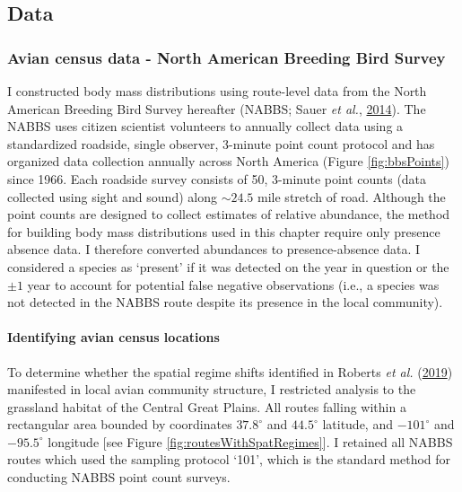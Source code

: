 \documentclass[12pt,twoside,openany]{reedthesis}
\begin{document}
\hypertarget{data}{%
\subsection{Data}\label{data}}

\hypertarget{avian-census-data---north-american-breeding-bird-survey}{%
\subsubsection{Avian census data - North American Breeding Bird Survey}\label{avian-census-data---north-american-breeding-bird-survey}}

I constructed body mass distributions using route-level data from the North American Breeding Bird Survey hereafter (NABBS; Sauer \emph{et al.}, \protect\hyperlink{ref-sauer2017results}{2014}). The NABBS uses citizen scientist volunteers to annually collect data using a standardized roadside, single observer, 3-minute point count protocol and has organized data collection annually across North America (Figure \ref{fig:bbsPoints}) since 1966. Each roadside survey consists of 50, 3-minute point counts (data collected using sight and sound) along \(\sim24.5\) mile stretch of road. Although the point counts are designed to collect estimates of relative abundance, the method for building body mass distributions used in this chapter require only presence absence data. I therefore converted abundances to presence-absence data. I considered a species as `present' if it was detected on the year in question or the \(\pm 1\) year to account for potential false negative observations (i.e., a species was not detected in the NABBS route despite its presence in the local community).

\hypertarget{identifying-avian-census-locations}{%
\paragraph{Identifying avian census locations}\label{identifying-avian-census-locations}}

To determine whether the spatial regime shifts identified in Roberts \emph{et al.} (\protect\hyperlink{ref-roberts2019shifting}{2019}) manifested in local avian community structure, I restricted analysis to the grassland habitat of the Central Great Plains. All routes falling within a rectangular area bounded by coordinates \(37.8^\circ\) and \(44.5^\circ\) latitude, and \(-101^\circ\) and \(-95.5^\circ\) longitude {[}see Figure \ref{fig:routesWithSpatRegimes}{]}. I retained all NABBS routes which used the sampling protocol `101', which is the standard method for conducting NABBS point count surveys.
\end{document}
